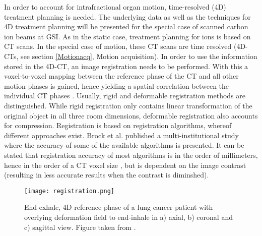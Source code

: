 \documentclass[type=dr, dr=rernat, accentcolor=tud7b,colorbacktitle, bigchapter, openright, twoside, 12pt ]{tudthesis}
\begin{document}
In order to account for intrafractional organ motion, time-resolved (4D) treatment planning is needed. The underlying data as well 
as the techniques for 4D treatment planning will be presented for the special case of scanned carbon ion beams at GSI.\newline
\newline
As in the static case, treatment planning for ions is based on CT scans. In the special case of motion, these CT scans are time resolved 
(4D-CTs, see section \ref{Motionacq}, Motion acquisition). In order to use the information stored in the 4D-CT, an image registration needs 
to be performed. With this a voxel-to-voxel mapping between the reference phase of the CT and all other motion phases is gained, hence 
yielding a spatial correlation between the individual CT phases \cite{Ric12}. Usually, rigid and deformable registration methods are 
distinguished. While rigid registration only contains linear transformation of the original object in all three room dimensions, 
deformable registration also accounts for compression. Registration is based on registration algorithms, whereof different approaches 
exist. Brock et al. \cite{Bro10} published a multi-institutional study where the accuracy of some of the available algorithms is 
presented. It can be stated that registration accuracy of most algorithms is in the order of millimeters, hence in the order of a CT 
voxel size \cite{Ric12}, but is dependent on the image contrast (resulting in less accurate results when the contrast is diminshed).

\begin{figure}[H]
\begin{center}
\texttt{[image: registration.png]}
\caption{End-exhale, 4D reference phase of a lung cancer patient with overlying deformation field to end-inhale in a) axial, b) coronal and 
c) sagittal view. Figure taken from \cite{Ric12}.}
\end{center}
\end{figure}
\end{document}
